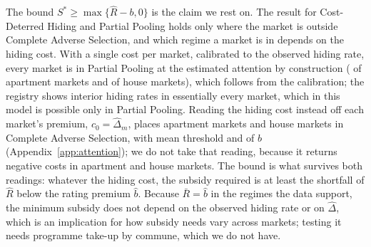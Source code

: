 The bound $S^*\ge\max\{\hat R-b,0\}$ is the claim we rest on. The result for Cost-Deterred Hiding and Partial Pooling holds only where the market is outside Complete Adverse Selection, and which regime a market is in depends on the hiding cost. With a single cost per market, calibrated to the observed hiding rate, every market is in Partial Pooling at the estimated attention by construction (\attScBaseNPpApt{} of \attNMarketsApt{} apartment markets and \attScBaseNPpHouse{} of \attNMarketsHouse{} house markets), which follows from the calibration; the registry shows interior hiding rates in essentially every market, which in this model is possible only in Partial Pooling. Reading the hiding cost instead off each market's premium, $c_0=\hat\Delta_m$, places \attRawNCasApt{} apartment markets and \attRawNCasHouse{} house markets in Complete Adverse Selection, with mean threshold \attRawRbarRatioApt{} and \attRawRbarRatioHouse{} of $b$ (Appendix~\ref{app:attention}); we do not take that reading, because it returns negative costs in \attRawNNegApt{} apartment and \attRawNNegHouse{} house markets. The bound is what survives both readings: whatever the hiding cost, the subsidy required is at least the shortfall of $\hat R$ below the rating premium $\hat b$. Because $\bar R=\hat b$ in the regimes the data support, the minimum subsidy does not depend on the observed hiding rate or on $\hat\Delta$, which is an implication for how subsidy needs vary across markets; testing it needs programme take-up by commune, which we do not have.
